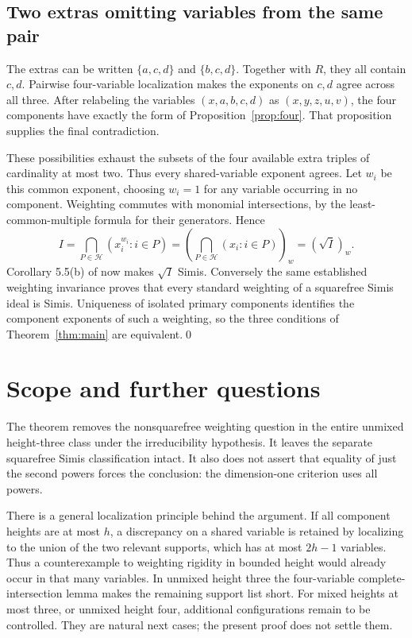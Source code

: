 \documentclass[11pt]{article}
\begin{document}
\subsection*{Two extras omitting variables from the same pair}
The extras can be written $\{a,c,d\}$ and $\{b,c,d\}$.
Together with $R$, they all contain $c,d$. Pairwise four-variable
localization makes the exponents on $c,d$ agree across all three.
After relabeling the variables $(x,a,b,c,d)$ as $(x,y,z,u,v)$,
the four components have exactly the form of
Proposition~\ref{prop:four}. That proposition supplies the final
contradiction.

These possibilities exhaust the subsets of the four available extra
triples of cardinality at most two. Thus every shared-variable
exponent agrees. Let $w_i$ be this common exponent, choosing $w_i=1$
for any variable occurring in no component. Weighting commutes with
monomial intersections, by the least-common-multiple formula for
their generators. Hence
\[
 I=\bigcap_{P\in\mathcal H}(x_i^{w_i}:i\in P)
   =\left(\bigcap_{P\in\mathcal H}(x_i:i\in P)\right)_w
   =(\sqrt I)_w.
\]
Corollary 5.5(b) of \cite{MPV} now makes $\sqrt I$ Simis.
Conversely the same established weighting invariance proves that
every standard weighting of a squarefree Simis ideal is Simis.
Uniqueness of isolated primary components identifies the component
exponents of such a weighting, so the three conditions of
Theorem~\ref{thm:main} are equivalent.\qed

\section{Scope and further questions}
The theorem removes the nonsquarefree weighting question in the
entire unmixed height-three class under the irreducibility hypothesis.
It leaves the separate squarefree Simis classification intact.
It also does not assert that equality of just the second powers
forces the conclusion: the dimension-one criterion uses all powers.

There is a general localization principle behind the argument.
If all component heights are at most $h$, a discrepancy on a shared
variable is retained by localizing to the union of the two relevant
supports, which has at most $2h-1$ variables. Thus a counterexample
to weighting rigidity in bounded height would already occur in
that many variables. In unmixed height three the four-variable
complete-intersection lemma makes the remaining support list short.
For mixed heights at most three, or unmixed height four, additional
configurations remain to be controlled. They are natural next cases;
the present proof does not settle them.
\end{document}
